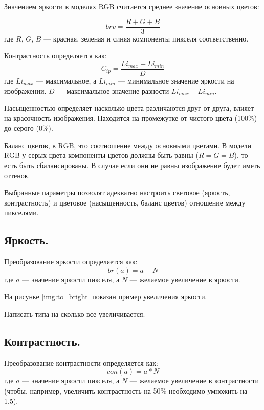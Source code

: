 Значением яркости в моделях RGB считается среднее значение основных цветов:

\begin{equation}
	\label{br}
	brv = \frac{R + G + B}{3}
\end{equation}
где $R$, $G$, $B$ --- красная, зеленая и синяя компоненты пикселя соответственно. \cite{colorfaq}

Контрастность определяется как:
\begin{equation}
	\label{condef}
	C_{ip} = \frac{Li_{max} - Li_{min}}{D}
\end{equation}
где $Li_{max}$ --- максимальное, а $Li_{min}$ --- минимальное значение яркости на изображении. $D$ --- максимальное значение разности $Li_{max} - Li_{min}$. \cite{contrastdef}

Насыщенностью определяет насколько цвета различаются друг от друга, влияет на красочность изображения. Находится на промежутке от чистого цвета (100\%) до серого (0\%). \cite{satdef}

Баланс цветов, в RGB, это соотношение между основными цветами. В модели RGB у серых цвета компоненты цветов должны быть равны ($R = G = B$), то есть быть сбалансированы. В случае если они не равны изображение будет иметь оттенок.\cite{colorb}

Выбранные параметры позволят адекватно настроить световое (яркость, контрастность) и цветовое (насыщенность, баланс цветов) отношение между пикселями. 

\subsection{Яркость.}

Преобразование яркости определяется как:
\begin{equation}
	\label{brightness}
	br(a) = a + N
\end{equation}
где $a$ --- значение яркости пикселя, а $N$ --- желаемое увеличение в яркости. \cite{brk}

На рисунке \ref{img:to_bright} показан пример увеличения яркости.

Написать типа на сколько все увеличивается.

\subsection{Контрастность.}

Преобразование контрастности определяется как:
\begin{equation}
	\label{contrast}
	con(a) = a * N
\end{equation}
где $a$ --- значение яркости пикселя, а $N$ --- желаемое увеличение в контрастности (чтобы, например, увеличить контрастность на 50\% необходимо умножить на 1.5). \cite{brk}

